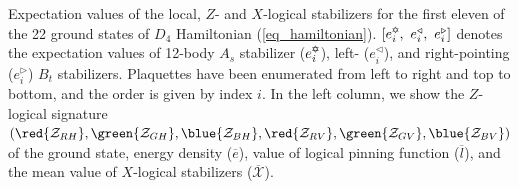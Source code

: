 \documentclass[12pt,a4paper]{standalone}
\begin{document}
\begin {table*}
\begin{center}
{\begin{tabular}{c @{\ }@{\ }|@{\ }@{\ } c }
\end{tabular}}
    \egroup
    \end{center}\caption{Expectation values of the local, $Z$- and $X$-logical stabilizers for the first eleven of the 22 ground states of $D_4$ Hamiltonian (\ref{eq_hamiltonian}). $[e^\text{\ding{65}}_i,\ e^{\triangleleft}_i,\ e^{\triangleright}_i]$ denotes the expectation values of 12-body $A_s$ stabilizer ($e^\text{\ding{65}}_i$), left- ($e^{\triangleleft}_i$), and right-pointing ($e^{\triangleright}_i $) $B_t$ stabilizers. Plaquettes have been enumerated from left to right and top to bottom, and the order is given by index $i$. In the left column, we show the $Z$-logical signature $(\red{\mathcal{Z}_{RH}},\green{\mathcal{Z}_{GH}},\blue{\mathcal{Z}_{BH}},\red{\mathcal{Z}_{RV}},\green{\mathcal{Z}_{GV}},\blue{\mathcal{Z}_{BV}})$ of the ground state, energy density ($\overline{e}$), value of logical pinning function ($\overline{l}$), and the mean value of $X$-logical stabilizers ($\overline{\mathcal{X}}$).}\label{table:22_gss_a}\end 
    {table*}
        
\end{document}
